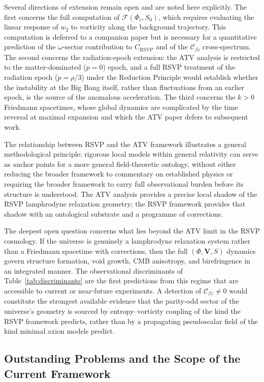 \documentclass[12pt,a4paper]{article}
\theoremstyle{plain}
\theoremstyle{definition}
\theoremstyle{remark}
\newcommand{\Phic}{\Phi_c}
\newcommand{\Cbz}{\mathcal{C}_{\beta z}}
\begin{document}
Several directions of extension remain open and are noted here explicitly. The first
concerns the full computation of $\mathcal{F}(\Phic,S_0)$, which requires evaluating
the linear response of $w_2$ to vorticity along the background trajectory. This
computation is deferred to a companion paper but is necessary for a quantitative
prediction of the $\omega$-sector contribution to $C_{\mathrm{RSVP}}$ and of the
$\Cbz$ cross-spectrum. The second concerns the radiation-epoch extension: the ATV
analysis is restricted to the matter-dominated ($p=0$) epoch, and a full RSVP
treatment of the radiation epoch ($p = \rho/3$) under the Reduction Principle
would establish whether the instability at the Big Bang itself, rather than
fluctuations from an earlier epoch, is the source of the anomalous acceleration.
The third concerns the $k>0$ Friedmann spacetimes, whose global dynamics are
complicated by the time reversal at maximal expansion and which the ATV paper
defers to subsequent work.

The relationship between RSVP and the ATV framework illustrates a general
methodological principle: rigorous local models within general relativity can serve
as anchor points for a more general field-theoretic ontology, without either reducing
the broader framework to commentary on established physics or requiring the broader
framework to carry full observational burden before its structure is understood.
The ATV analysis provides a precise local shadow of the RSVP lamphrodyne relaxation
geometry; the RSVP framework provides that shadow with an ontological substrate
and a programme of corrections.

The deepest open question concerns what lies beyond the ATV limit in the RSVP
cosmology. If the universe is genuinely a lamphrodyne relaxation system rather than
a Friedmann spacetime with corrections, then the full $(\Phi,\mathbf{V},S)$
dynamics govern structure formation, void growth, CMB anisotropy, and birefringence
in an integrated manner. The observational discriminants of Table~\ref{tab:discriminants}
are the first predictions from this regime that are accessible to current or
near-future experiments. A detection of $\Cbz\neq 0$ would constitute the
strongest available evidence that the parity-odd sector of the universe's geometry
is sourced by entropy--vorticity coupling of the kind the RSVP framework predicts,
rather than by a propagating pseudoscalar field of the kind minimal axion models predict.

\subsection{Outstanding Problems and the Scope of the Current Framework}
\label{subsec:open_problems}
\end{document}

